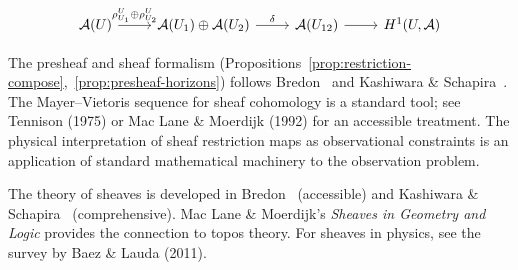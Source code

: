 \[
\begin{tikzcd}
  \mathcal{A}(U)
  \arrow[r,"\rho^U_{U_1} \oplus \rho^U_{U_2}"]
  &
  \mathcal{A}(U_1) \oplus \mathcal{A}(U_2)
  \arrow[r,"\delta"]
  &
  \mathcal{A}(U_{12})
  \arrow[r]
  &
  H^1(U,\mathcal{A})
\end{tikzcd}
\]

\begin{CitationAnchor}
  The presheaf and sheaf formalism (Propositions~\ref{prop:restriction-compose},~\ref{prop:presheaf-horizons})
  follows Bredon~\cite{bredon1997} and Kashiwara \& Schapira~\cite{kashiwara2006}.
  The Mayer--Vietoris sequence for sheaf cohomology is a standard
  tool; see Tennison (1975) or Mac Lane \& Moerdijk (1992) for
  an accessible treatment.
  The physical interpretation of sheaf restriction maps as
  observational constraints is an application of standard
  mathematical machinery to the observation problem.
\end{CitationAnchor}

\begin{FurtherReading}
  The theory of sheaves is developed in Bredon~\cite{bredon1997}
  (accessible) and Kashiwara \& Schapira~\cite{kashiwara2006}
  (comprehensive).
  Mac Lane \& Moerdijk's \textit{Sheaves in Geometry and Logic}
  provides the connection to topos theory.
  For sheaves in physics, see the survey by Baez \& Lauda (2011).
\end{FurtherReading}
